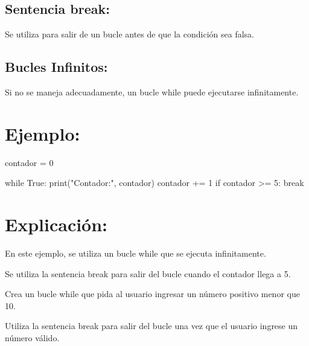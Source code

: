 \documentclass[
  a4paper,
  onepage,
  openany]{scrreprt}
\newenvironment{Shaded}{\begin{snugshade}}{\end{snugshade}}
\newcommand{\BuiltInTok}[1]{\textcolor[rgb]{0.00,0.23,0.31}{#1}}
\newcommand{\ControlFlowTok}[1]{\textcolor[rgb]{0.00,0.23,0.31}{#1}}
\newcommand{\DecValTok}[1]{\textcolor[rgb]{0.68,0.00,0.00}{#1}}
\newcommand{\NormalTok}[1]{\textcolor[rgb]{0.00,0.23,0.31}{#1}}
\newcommand{\OperatorTok}[1]{\textcolor[rgb]{0.37,0.37,0.37}{#1}}
\newcommand{\StringTok}[1]{\textcolor[rgb]{0.13,0.47,0.30}{#1}}
\newcommand{\VariableTok}[1]{\textcolor[rgb]{0.07,0.07,0.07}{#1}}
\begin{document}
\hypertarget{sentencia-break-1}{%
\subsection{Sentencia break:}\label{sentencia-break-1}}

Se utiliza para salir de un bucle antes de que la condición sea falsa.

\hypertarget{bucles-infinitos-1}{%
\subsection{Bucles Infinitos:}\label{bucles-infinitos-1}}

Si no se maneja adecuadamente, un bucle while puede ejecutarse
infinitamente.

\hypertarget{ejemplo-39}{%
\section{Ejemplo:}\label{ejemplo-39}}

\begin{Shaded}
\begin{Highlighting}[]
\NormalTok{contador }\OperatorTok{=} \DecValTok{0}

\ControlFlowTok{while} \VariableTok{True}\NormalTok{:}
    \BuiltInTok{print}\NormalTok{(}\StringTok{"Contador:"}\NormalTok{, contador)}
\NormalTok{    contador }\OperatorTok{+=} \DecValTok{1}
    \ControlFlowTok{if}\NormalTok{ contador }\OperatorTok{\textgreater{}=} \DecValTok{5}\NormalTok{:}
        \ControlFlowTok{break}
\end{Highlighting}
\end{Shaded}

\hypertarget{explicaciuxf3n-39}{%
\section{Explicación:}\label{explicaciuxf3n-39}}

En este ejemplo, se utiliza un bucle while que se ejecuta infinitamente.

Se utiliza la sentencia break para salir del bucle cuando el contador
llega a 5.

\begin{tcolorbox}[enhanced jigsaw, breakable, opacityback=0, toptitle=1mm, coltitle=black, toprule=.15mm, rightrule=.15mm, colframe=quarto-callout-important-color-frame, opacitybacktitle=0.6, arc=.35mm, title=\textcolor{quarto-callout-important-color}{\faExclamation}\hspace{0.5em}{Actividad Práctica:}, titlerule=0mm, colbacktitle=quarto-callout-important-color!10!white, bottomtitle=1mm, bottomrule=.15mm, colback=white, left=2mm, leftrule=.75mm]

Crea un bucle while que pida al usuario ingresar un número positivo
menor que 10.

Utiliza la sentencia break para salir del bucle una vez que el usuario
ingrese un número válido.

\end{tcolorbox}
\end{document}
